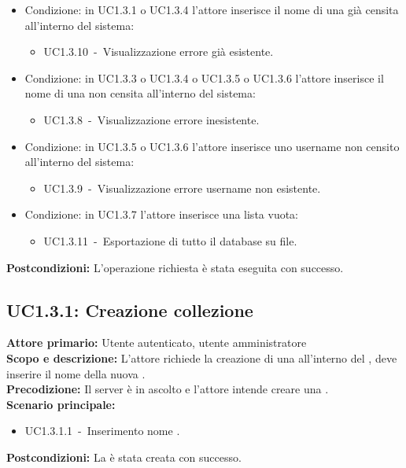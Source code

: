 \documentclass{scalatekids-article}
\begin{document}
\begin{itemize}
\item Condizione: in UC1.3.1 o UC1.3.4 l'attore inserisce il nome di una  già censita all'interno del sistema:
  \begin{itemize}
  \item UC1.3.10\ -\ Visualizzazione errore  già esistente.
  \end{itemize}
\item Condizione: in UC1.3.3 o UC1.3.4 o UC1.3.5 o UC1.3.6 l'attore inserisce il nome di una  non censita all'interno del sistema:
  \begin{itemize}
  \item UC1.3.8\ -\ Visualizzazione errore  inesistente.
  \end{itemize}
\item Condizione: in UC1.3.5 o UC1.3.6 l'attore inserisce uno username non censito all'interno del sistema:
  \begin{itemize}
  \item UC1.3.9\ -\ Visualizzazione errore username non esistente.
  \end{itemize}
\item Condizione: in UC1.3.7 l'attore inserisce una lista  vuota:
  \begin{itemize}
  \item UC1.3.11\ -\ Esportazione di tutto il database su file.
  \end{itemize}
\end{itemize}
\textbf{Postcondizioni:} L'operazione richiesta è stata eseguita con successo.

\subsection{UC1.3.1: Creazione collezione}

\textbf{Attore primario:} Utente autenticato, utente amministratore\\
\textbf{Scopo e descrizione:} L'attore richiede la creazione di una  all'interno del , deve inserire il nome della nuova .\\
\textbf{Precodizione:} Il server è in ascolto e l'attore intende creare una .\\
\textbf{Scenario principale:}
\begin{itemize}
\item UC1.3.1.1\ -\ Inserimento nome .
\end{itemize}
\textbf{Postcondizioni:} La  è stata creata con successo.
\end{document}
